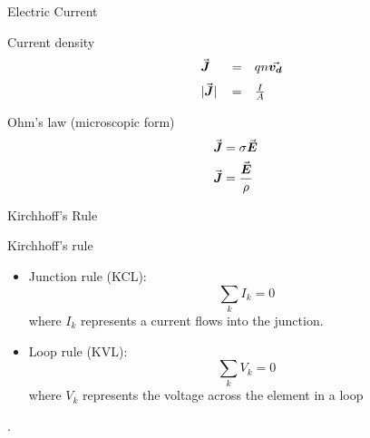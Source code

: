 \documentclass{beamer}
\begin{document}
\begin{frame}{Electric Current}
    \begin{beamerboxesrounded}[shadow=true]{Current density}
        \begin{equation}
            \begin{array}{llll}
               & \va*{J} &=& qn\va*{v_d} \vspace{.6em}\\
               & \abs*{\va*{J}} &=& \frac{I}{A}
            \end{array}
        \end{equation}
    \end{beamerboxesrounded}
    \vfill
    \begin{beamerboxesrounded}[shadow=true]{Ohm's law (microscopic form)}
        \begin{equation}
            \begin{split}
                \va*{J} &= \sigma \va*{E} \\
                \va*{J} &= \frac{\va*{E}}{\rho}
            \end{split}
        \end{equation}
    \end{beamerboxesrounded}
\end{frame}

\begin{frame}{Kirchhoff's Rule}
    \begin{block}{Kirchhoff's rule}
        \begin{itemize}
            \item Junction rule (KCL):
                \begin{equation}
                    \sum_k I_k = 0
                \end{equation}
                where $I_k$ represents a current flows into the junction.
            \item Loop rule (KVL):
                \begin{equation}
                    \sum_k V_k = 0
                \end{equation}
                where $V_k$ represents the voltage across the element in a loop
        \end{itemize}.
    \end{block}
\end{frame}
\end{document}

